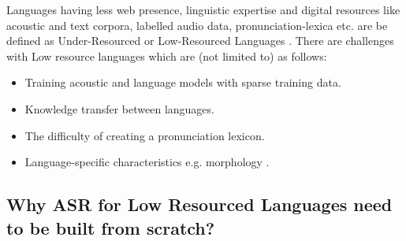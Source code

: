 Languages having less web presence, linguistic expertise and digital resources like acoustic and text corpora, labelled audio data, pronunciation-lexica etc. are be defined as Under-Resourced or Low-Resourced Languages \cite{besacier_automatic_2014}. There are challenges with Low resource languages which are (not limited to) as follows:
\begin{itemize}
    \item Training acoustic and language models with sparse training data.
    \item Knowledge transfer between languages.
    \item The difficulty of creating a pronunciation lexicon.
    \item Language-specific characteristics e.g. morphology \cite{besacier_automatic_2014}.
\end{itemize}





\subsection{Why ASR for Low Resourced Languages need to be built from scratch?}
\label{sub:ASR_from_scratch}

